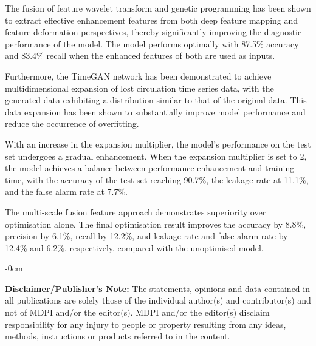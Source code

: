\documentclass[journal,article,submit,pdftex,moreauthors]{Definitions/mdpi}
\begin{document}
The fusion of feature wavelet transform and genetic programming has been shown to extract effective enhancement features from both deep feature mapping and feature deformation perspectives, thereby significantly improving the diagnostic performance of the model. The model performs optimally with 87.5\% accuracy and 83.4\% recall when the enhanced features of both are used as inputs.

Furthermore, the TimeGAN network has been demonstrated to achieve multidimensional expansion of lost circulation time series data, with the generated data exhibiting a distribution similar to that of the original data. This data expansion has been shown to substantially improve model performance and reduce the occurrence of overfitting. 

With an increase in the expansion multiplier, the model's performance on the test set undergoes a gradual enhancement. When the expansion multiplier is set to 2, the model achieves a balance between performance enhancement and training time, with the accuracy of the test set reaching 90.7\%, the leakage rate at 11.1\%, and the false alarm rate at 7.7\%.

The multi-scale fusion feature approach demonstrates superiority over optimisation alone. The final optimisation result improves the accuracy by 8.8\%, precision by 6.1\%, recall by 12.2\%, and leakage rate and false alarm rate by 12.4\% and 6.2\%, respectively, compared with the unoptimised model.




\begin{adjustwidth}{-\extralength}{0cm}





\vspace{20pt} 

\noindent \textbf{Disclaimer/Publisher’s Note:} The statements, opinions and data contained in all publications are solely those of the individual author(s) and contributor(s) and not of MDPI and/or the editor(s). MDPI and/or the editor(s) disclaim responsibility for any injury to people or property resulting from any ideas, methods, instructions or products referred to in the content.


\end{adjustwidth}




\end{document}
